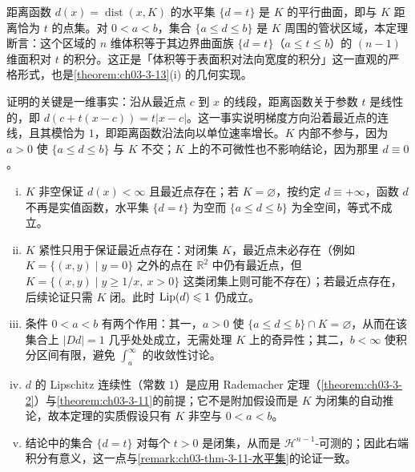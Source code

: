 \documentclass[../../main.tex]{subfiles}%
\begin{document}
\begin{remark}\label{remark:ch03-thm-3-14-动机}
距离函数 $d(x)=\operatorname{dist}(x,K)$ 的水平集 $\{d=t\}$ 是 $K$ 的平行曲面，即与 $K$ 距离恰为 $t$ 的点集。对 $0<a<b$，集合 $\{a\leqslant d\leqslant b\}$ 是 $K$ 周围的管状区域，本定理断言：这个区域的 $n$ 维体积等于其边界曲面族 $\{d=t\}$（$a\leqslant t\leqslant b$）的 $(n-1)$ 维面积对 $t$ 的积分。这正是「体积等于表面积对法向宽度的积分」这一直观的严格形式，也是\cref{theorem:ch03-3-13}(i) 的几何实现。%

证明的关键是一维事实：沿从最近点 $c$ 到 $x$ 的线段，距离函数关于参数 $t$ 是线性的，即 $d(c+t(x-c))=t\lvert x-c\rvert$。这一事实说明梯度方向沿着最近点的连线，且其模恰为 $1$，即距离函数沿法向以单位速率增长。$K$ 内部不参与，因为 $a>0$ 使 $\{a\leqslant d\leqslant b\}$ 与 $K$ 不交；$K$ 上的不可微性也不影响结论，因为那里 $d\equiv0$。
\end{remark}

\begin{remark}\label{remark:ch03-thm-3-14-条件}
\begin{enumerate}[(i)]
\item $K$ 非空保证 $d(x)<\infty$ 且最近点存在；若 $K=\varnothing$，按约定 $d\equiv+\infty$，函数 $d$ 不再是实值函数，水平集 $\{d=t\}$ 为空而 $\{a\leqslant d\leqslant b\}$ 为全空间，等式不成立。
\item $K$ 紧性只用于保证最近点存在：对闭集 $K$，最近点未必存在（例如 $K=\{(x,y)\mid y=0\}$ 之外的点在 $\mathbb{R}^2$ 中仍有最近点，但 $K=\{(x,y)\mid y\geqslant1/x,\ x>0\}$ 这类闭集上则可能不存在）；若最近点存在，后续论证只需 $K$ 闭。此时 $\operatorname{Lip}(d)\leqslant1$ 仍成立。
\item 条件 $0<a<b$ 有两个作用：其一，$a>0$ 使 $\{a\leqslant d\leqslant b\}\cap K=\varnothing$，从而在该集合上 $\lvert Dd\rvert=1$ 几乎处处成立，无需处理 $K$ 上的奇异性；其二，$b<\infty$ 使积分区间有限，避免 $\int_a^{\infty}$ 的收敛性讨论。
\item $d$ 的 Lipschitz 连续性（常数 $1$）是应用 Rademacher 定理（\cref{theorem:ch03-3-2}）与\cref{theorem:ch03-3-11}的前提；它不是附加假设而是 $K$ 为闭集的自动推论，故本定理的实质假设只有 $K$ 非空与 $0<a<b$。%
\item 结论中的集合 $\{d=t\}$ 对每个 $t>0$ 是闭集，从而是 $\mathcal{H}^{n-1}$-可测的；因此右端积分有意义，这一点与\cref{remark:ch03-thm-3-11-水平集}的论证一致。%
\end{enumerate}
\end{remark}
\end{document}
